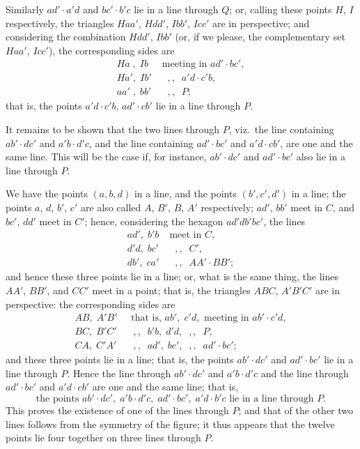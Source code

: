 \documentclass[11pt]{article}
\begin{document}
Similarly $ad' \cdot a'd$ and $bc' \cdot b'c$ lie in a line through $Q$; or, calling these points $H$, $I$ respectively, the triangles $Haa'$, $Hdd'$, $Ibb'$, $Icc'$ are in perspective; and considering the combination $Hdd'$, $Ibb'$ (or, if we please, the complementary set $Haa'$, $Icc'$), the corresponding sides are
\begin{align*}
Ha\;,\; Ib \;&\text{meeting in } ad' \cdot bc',\\
Ha',\; Ib' \;&\;\; ,, \;\; a'd \cdot c'b,\\
aa'\;,\; bb' \;&\;\; ,, \;\; P;
\end{align*}
that is, the points $a'd \cdot c'b$, $ad' \cdot cb'$ lie in a line through $P$.

\newpage

\noindent It remains to be shown that the two lines through $P$, viz.\ the line containing $ab' \cdot dc'$ and $a'b \cdot d'c$, and the line containing $ad' \cdot bc'$ and $a'd \cdot cb'$, are one and the same line. This will be the case if, for instance, $ab' \cdot dc'$ and $ad' \cdot bc'$ also lie in a line through $P$.

We have the points $(a, b, d)$ in a line, and the points $(b', c', d')$ in a line; the points $a$, $d$, $b'$, $c'$ are also called $A$, $B'$, $B$, $A'$ respectively; $ad'$, $bb'$ meet in $C$, and $bc'$, $dd'$ meet in $C'$; hence, considering the hexagon $ad'db'bc'$, the lines
\begin{align*}
ad',\; b'b \;&\text{meet in } C,\\
d'd,\; bc' \;&\;\; ,, \;\; C',\\
db',\; ca' \;&\;\; ,, \;\; AA' \cdot BB';
\end{align*}
and hence these three points lie in a line; or, what is the same thing, the lines $AA'$, $BB'$, and $CC'$ meet in a point; that is, the triangles $ABC$, $A'B'C'$ are in perspective: the corresponding sides are
\begin{align*}
AB,\; A'B'\;&\text{ that is, } ab',\; c'd, \text{ meeting in } ab' \cdot c'd,\\
BC,\; B'C'\;&\;\; ,, \;\; b'b,\; d'd,\;\; ,, \;\; P,\\
CA,\; C'A'\;&\;\; ,, \;\; ad',\; bc',\;\; ,, \;\; ad' \cdot bc';
\end{align*}
and these three points lie in a line; that is, the points $ab' \cdot dc'$ and $ad' \cdot bc'$ lie in a line through $P$. Hence the line through $ab' \cdot dc'$ and $a'b \cdot d'c$ and the line through $ad' \cdot bc'$ and $a'd \cdot cb'$ are one and the same line; that is,
\[
\text{the points } ab' \cdot dc',\; a'b \cdot d'c,\; ad' \cdot bc',\; a'd \cdot b'c \text{ lie in a line through } P.
\]
This proves the existence of one of the lines through $P$; and that of the other two lines follows from the symmetry of the figure; it thus appears that the twelve points lie four together on three lines through $P$.
\end{document}
